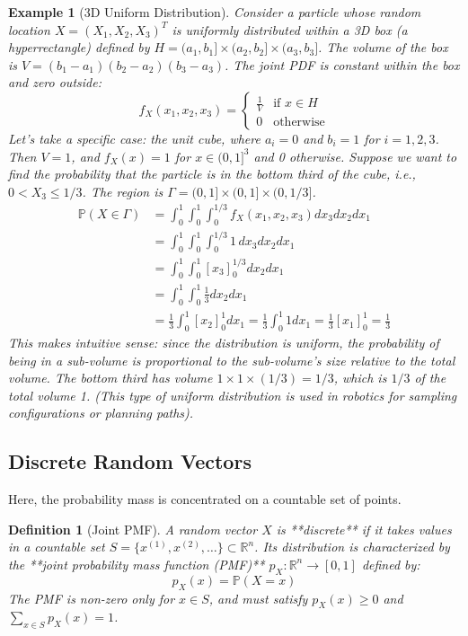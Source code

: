 \documentclass[11pt]{article}
\newtheorem{definition}[theorem]{Definition}
\newtheorem{example}[theorem]{Example}
\theoremstyle{definition} %
\newcommand{\R}{\mathbb{R}} %
\renewcommand{\P}{\mathbb{P}} %
\begin{document}
\begin{example}[3D Uniform Distribution] \label{ex:3d_uniform}
Consider a particle whose random location $X = (X_1, X_2, X_3)^T$ is uniformly distributed within a 3D box (a hyperrectangle) defined by $H = (a_1, b_1] \times (a_2, b_2] \times (a_3, b_3]$.
The volume of the box is $V = (b_1 - a_1)(b_2 - a_2)(b_3 - a_3)$.
The joint PDF is constant within the box and zero outside:
\[ f_X(x_1, x_2, x_3) = \begin{cases} \frac{1}{V} & \text{if } x \in H \\ 0 & \text{otherwise} \end{cases} \]
Let's take a specific case: the unit cube, where $a_i = 0$ and $b_i = 1$ for $i=1, 2, 3$. Then $V = 1$, and $f_X(x) = 1$ for $x \in (0, 1]^3$ and 0 otherwise.
Suppose we want to find the probability that the particle is in the bottom third of the cube, i.e., $0 < X_3 \le 1/3$. The region is $\Gamma = (0, 1] \times (0, 1] \times (0, 1/3]$.
\begin{align*} \P(X \in \Gamma) &= \int_{0}^{1} \int_{0}^{1} \int_{0}^{1/3} f_X(x_1, x_2, x_3) dx_3 dx_2 dx_1 \\ &= \int_{0}^{1} \int_{0}^{1} \int_{0}^{1/3} 1 \, dx_3 dx_2 dx_1 \\ &= \int_{0}^{1} \int_{0}^{1} [x_3]_0^{1/3} dx_2 dx_1 \\ &= \int_{0}^{1} \int_{0}^{1} \frac{1}{3} dx_2 dx_1 \\ &= \frac{1}{3} \int_{0}^{1} [x_2]_0^1 dx_1 = \frac{1}{3} \int_{0}^{1} 1 dx_1 = \frac{1}{3} [x_1]_0^1 = \frac{1}{3} \end{align*}
This makes intuitive sense: since the distribution is uniform, the probability of being in a sub-volume is proportional to the sub-volume's size relative to the total volume. The bottom third has volume $1 \times 1 \times (1/3) = 1/3$, which is $1/3$ of the total volume 1.
(This type of uniform distribution is used in robotics for sampling configurations or planning paths).
\end{example}

\subsection{Discrete Random Vectors}

Here, the probability mass is concentrated on a countable set of points.

\begin{definition}[Joint PMF]
A random vector $X$ is **discrete** if it takes values in a countable set $S = \{x^{(1)}, x^{(2)}, \dots\} \subset \R^n$. Its distribution is characterized by the **joint probability mass function (PMF)** $p_X: \R^n \to [0, 1]$ defined by:
\[ p_X(x) = \P(X = x) \]
The PMF is non-zero only for $x \in S$, and must satisfy $p_X(x) \ge 0$ and $\sum_{x \in S} p_X(x) = 1$.
\end{definition}
\end{document}
